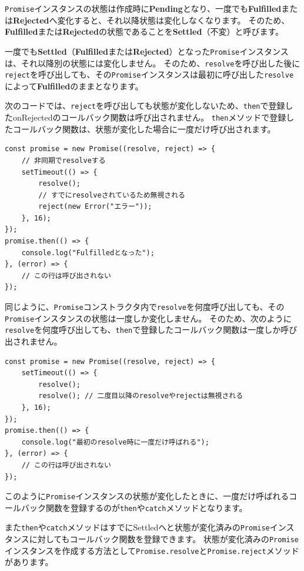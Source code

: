 \texttt{Promise}インスタンスの状態は作成時に\textbf{Pending}となり、一度でも\textbf{Fulfilled}または\textbf{Rejected}へ変化すると、それ以降状態は変化しなくなります。
そのため、\textbf{Fulfilled}または\textbf{Rejected}の状態であることを\textbf{Settled}（不変）と呼びます。

一度でも\textbf{Settled}（\textbf{Fulfilled}または\textbf{Rejected}）となった\texttt{Promise}インスタンスは、それ以降別の状態には変化しません。
そのため、\texttt{resolve}を呼び出した後に\texttt{reject}を呼び出しても、その\texttt{Promise}インスタンスは最初に呼び出した\texttt{resolve}によって\textbf{Fulfilled}のままとなります。

次のコードでは、\texttt{reject}を呼び出しても状態が変化しないため、\texttt{then}で登録したonRejectedのコールバック関数は呼び出されません。
\texttt{then}メソッドで登録したコールバック関数は、状態が変化した場合に一度だけ呼び出されます。

\begin{lstlisting}
const promise = new Promise((resolve, reject) => {
    // 非同期でresolveする
    setTimeout(() => {
        resolve();
        // すでにresolveされているため無視される
        reject(new Error("エラー"));
    }, 16);
});
promise.then(() => {
    console.log("Fulfilledとなった");
}, (error) => {
    // この行は呼び出されない
});
\end{lstlisting}

同じように、\texttt{Promise}コンストラクタ内で\texttt{resolve}を何度呼び出しても、その\texttt{Promise}インスタンスの状態は一度しか変化しません。
そのため、次のように\texttt{resolve}を何度呼び出しても、\texttt{then}で登録したコールバック関数は一度しか呼び出されません。

\begin{lstlisting}
const promise = new Promise((resolve, reject) => {
    setTimeout(() => {
        resolve();
        resolve(); // 二度目以降のresolveやrejectは無視される
    }, 16);
});
promise.then(() => {
    console.log("最初のresolve時に一度だけ呼ばれる");
}, (error) => {
    // この行は呼び出されない
});
\end{lstlisting}

このように\texttt{Promise}インスタンスの状態が変化したときに、一度だけ呼ばれるコールバック関数を登録するのが\texttt{then}や\texttt{catch}メソッドとなります。

また\texttt{then}や\texttt{catch}メソッドはすでにSettledへと状態が変化済みの\texttt{Promise}インスタンスに対してもコールバック関数を登録できます。
状態が変化済みの\texttt{Promise}インスタンスを作成する方法として\texttt{Promise.resolve}と\texttt{Promise.reject}メソッドがあります。

